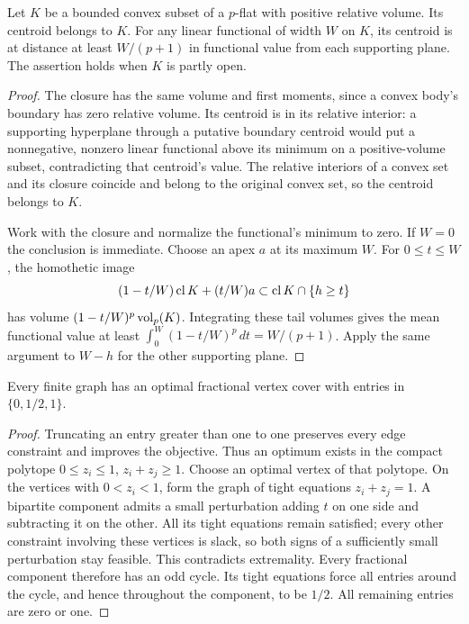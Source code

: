 \begin{lemma}
\label{app:geometry:lem-centroid}
Let $K$ be a bounded convex subset of a $p$-flat with positive
relative volume. Its centroid belongs to $K$. For any linear
functional of width $W$ on $K$, its centroid is at distance at least
$W/(p+1)$ in functional value from each supporting plane.
The assertion holds when $K$ is partly open.
\end{lemma}
\begin{proof}
The closure has the same volume and first moments, since a convex
body's boundary has zero relative volume. Its centroid is in its
relative interior: a supporting hyperplane through a putative boundary
centroid would put a nonnegative, nonzero linear functional above its
minimum on a positive-volume subset, contradicting that centroid's
value. The relative interiors of a convex set and its closure coincide
and belong to the original convex set, so the centroid belongs to $K$.

Work with the closure and normalize the functional's minimum to zero.
If $W=0$ the conclusion is immediate. Choose an apex $a$ at its maximum
$W$. For $0\leq t\leq W$, the homothetic image
\[
 (1-t/W)\operatorname{cl} K+(t/W)a
               \subset\operatorname{cl} K\cap\{h\geq t\}
\]
has volume $(1-t/W)^p\operatorname{vol}_p(K)$. Integrating these tail volumes gives
the mean functional value at least
$\int_0^W(1-t/W)^p\,dt=W/(p+1)$.
Apply the same argument to $W-h$ for the other supporting plane.
\end{proof}

\begin{lemma}
\label{app:geometry:lem-half-integral}
Every finite graph has an optimal fractional vertex cover with entries
in $\{0,1/2,1\}$.
\end{lemma}
\begin{proof}
Truncating an entry greater than one to one preserves every edge
constraint and improves the objective. Thus an optimum exists in the
compact polytope $0\leq z_i\leq1$, $z_i+z_j\geq1$. Choose an optimal
vertex of that polytope. On the vertices with $0<z_i<1$, form the graph
of tight equations $z_i+z_j=1$. A bipartite component admits a small
perturbation adding $t$ on one side and subtracting it on the other.
All its tight equations remain satisfied; every other constraint
involving these vertices is slack, so both signs of a sufficiently
small perturbation stay feasible. This contradicts extremality.
Every fractional component therefore has an odd cycle. Its tight
equations force all entries around the cycle, and hence throughout
the component, to be $1/2$. All remaining entries are zero or one.
\end{proof}

